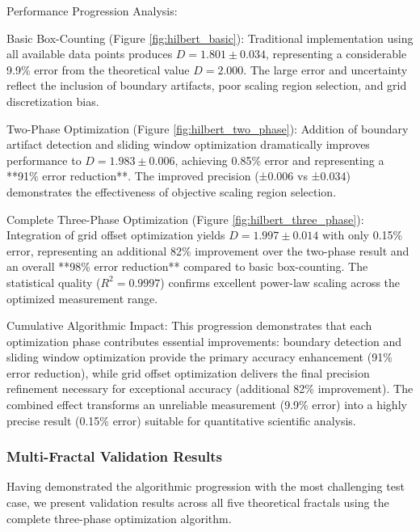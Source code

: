\documentclass[preprint,12pt]{elsarticle}
\def\textbf#1{#1}%
\begin{document}
\textbf{Performance Progression Analysis}:

\textbf{Basic Box-Counting} (Figure \ref{fig:hilbert_basic}): Traditional implementation using all available data points produces $D = 1.801 \pm 0.034$, representing a considerable 9.9\% error from the theoretical value $D = 2.000$. The large error and uncertainty reflect the inclusion of boundary artifacts, poor scaling region selection, and grid discretization bias.

\textbf{Two-Phase Optimization} (Figure \ref{fig:hilbert_two_phase}): Addition of boundary artifact detection and sliding window optimization dramatically improves performance to $D = 1.983 \pm 0.006$, achieving 0.85\% error and representing a **91\% error reduction**. The improved precision (±0.006 vs ±0.034) demonstrates the effectiveness of objective scaling region selection.

\textbf{Complete Three-Phase Optimization} (Figure \ref{fig:hilbert_three_phase}): Integration of grid offset optimization yields $D = 1.997 \pm 0.014$ with only 0.15\% error, representing an additional 82\% improvement over the two-phase result and an overall **98\% error reduction** compared to basic box-counting. The statistical quality ($R^2 = 0.9997$) confirms excellent power-law scaling across the optimized measurement range.

\textbf{Cumulative Algorithmic Impact}: This progression demonstrates that each optimization phase contributes essential improvements: boundary detection and sliding window optimization provide the primary accuracy enhancement (91\% error reduction), while grid offset optimization delivers the final precision refinement necessary for exceptional accuracy (additional 82\% improvement). The combined effect transforms an unreliable measurement (9.9\% error) into a highly precise result (0.15\% error) suitable for quantitative scientific analysis.

\subsubsection{Multi-Fractal Validation Results}

Having demonstrated the algorithmic progression with the most challenging test case, we present validation results across all five theoretical fractals using the complete three-phase optimization algorithm.
\end{document}
